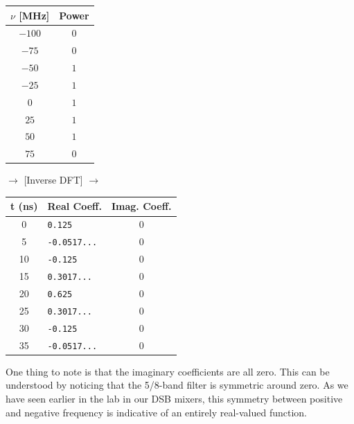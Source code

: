 \documentclass[12pt]{article}
\begin{document}
\begin{center}
  \begin{tabular}{ c | c }
    $\nu$ [MHz] & Power \\ \hline
    $-100$ & $0 $\\
    $-75$ & $0 $\\
    $-50$ & $1 $\\
    $-25$ & $1 $ \\
    $0$ & $1 $\\
    $25$ & $1 $  \\
    $50$ & $1$ \\
    $75$ & $0 $ \\
  \end{tabular}
  $\rightarrow$ [Inverse DFT] $\rightarrow$
  \begin{tabular}{c | l | c }
    t (ns)& Real Coeff. & Imag. Coeff.\\ \hline
    0 & \texttt{0.125} & $0$ \\
    5 & \texttt{-0.0517...}  & $0$ \\
    10 & \texttt{-0.125} & $0$ \\
    15 & \texttt{0.3017...} & $0$ \\
    20 & \texttt{0.625} & $0$ \\
    25 & \texttt{0.3017...} & $0$ \\
    30 & \texttt{-0.125} & $0$ \\
    35 & \texttt{-0.0517...} & $0$ \\
  \end{tabular}
\end{center}


One thing to note is that the imaginary coefficients are all zero. This can be understood by noticing that the 5/8-band filter is symmetric around zero. As we have seen earlier in the lab in our DSB mixers, this symmetry between positive and negative frequency is indicative of an entirely real-valued function.
\end{document}
